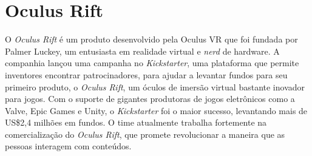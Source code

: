 \section{Oculus Rift} %
\label{sec:oculus_rift}

O \textit{Oculus Rift}\cite{oculusVR} é um produto desenvolvido pela Oculus VR\textsuperscript{\textregistered} que foi fundada por Palmer Luckey, um entusiasta em realidade virtual e \textit{nerd} de hardware. A companhia lançou uma campanha no \textit{Kickstarter}\cite{kickstarter}, uma plataforma que permite inventores encontrar patrocinadores, para ajudar a levantar fundos para seu primeiro produto, o \textit{Oculus Rift}, um óculos de imersão virtual bastante inovador para jogos. Com o suporte de gigantes produtoras de jogos eletrônicos como a Valve, Epic Games e Unity, o \textit{Kickstarter} foi o maior sucesso, levantando mais de US\$2,4 milhões em fundos. O time atualmente trabalha fortemente na comercialização do \textit{Oculus Rift}, que promete revolucionar a maneira que as pessoas interagem com conteúdos. 

